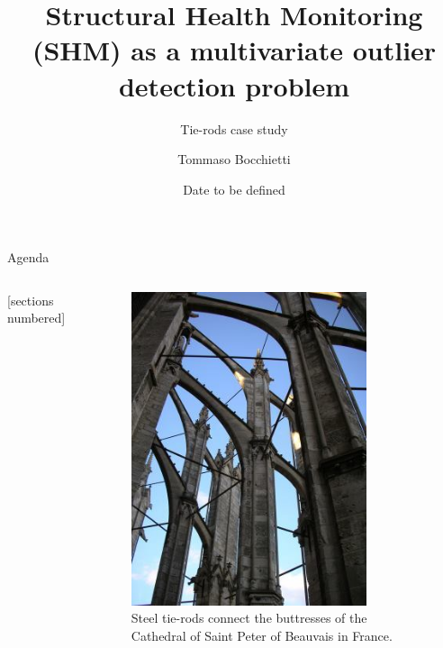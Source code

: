 \documentclass[9pt]{beamer}
\title{Structural Health Monitoring (SHM) as a multivariate outlier detection problem}
\subtitle{Tie-rods case study}
\date{Date to be defined}
\author{Tommaso Bocchietti}
\institute{Politecnico di Milano}
\begin{document}
\maketitle

\begin{frame}{Agenda}

    \begin{columns}[c, onlytextwidth]

        \begin{column}{0.5\textwidth}

            [sections numbered]
            \tableofcontents

        \end{column}

        \begin{column}{0.5\textwidth}

            \begin{figure}[H]
                \centering
                \includegraphics[width=0.8\textwidth]{img/tie-rods-cathedral.jpeg}
                \caption{Steel tie-rods connect the buttresses of the Cathedral of Saint Peter of Beauvais in France.}
            \end{figure}

        \end{column}

    \end{columns}

\end{frame}
\end{document}

